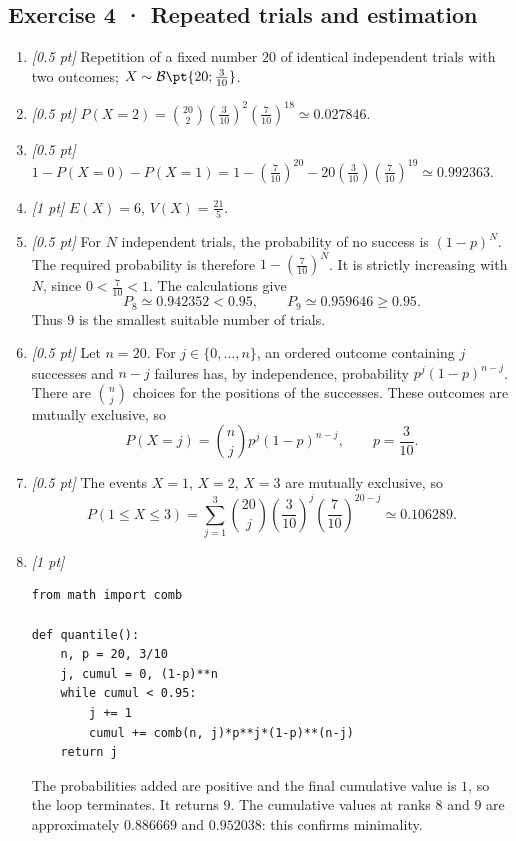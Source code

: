 \subsection*{Exercise 4 · Repeated trials and estimation}\begin{enumerate}

\item \textit{[0.5 pt]} Repetition of a fixed number $20$ of identical independent trials with two outcomes; $X\sim\mathcal B\pt{20;\frac{3}{10}}$.

\item \textit{[0.5 pt]} $P(X=2)=\binom{20}2(\frac{3}{10})^2(\frac{7}{10})^{18}\simeq\num{0,027846}$.

\item \textit{[0.5 pt]} $1-P(X=0)-P(X=1)=1-(\frac{7}{10})^{20}-20(\frac{3}{10})(\frac{7}{10})^{19}\simeq\num{0,992363}$.

\item \textit{[1 pt]} $E(X)=6$, $V(X)=\frac{21}{5}$.

\item \textit{[0.5 pt]} For $N$ independent trials, the probability of no success is $(1-p)^N$. The required probability is therefore $1-(\frac{7}{10})^N$. It is strictly increasing with $N$, since $0<\frac{7}{10}<1$. The calculations give
\[P_{8}\simeq\num{0,942352}<\num{0,95},\qquad P_{9}\simeq\num{0,959646}\ge\num{0,95}.\]
Thus $9$ is the smallest suitable number of trials.

\item \textit{[0.5 pt]} Let $n=20$. For $j\in\{0,\ldots,n\}$, an ordered outcome containing $j$ successes and $n-j$ failures has, by independence, probability $p^j(1-p)^{n-j}$. There are $\binom nj$ choices for the positions of the successes. These outcomes are mutually exclusive, so
\[P(X=j)=\binom nj p^j(1-p)^{n-j},\qquad p=\frac{3}{10}.\]

\item \textit{[0.5 pt]} The events $X=1$, $X=2$, $X=3$ are mutually exclusive, so
\[P(1\le X\le3)=\sum_{j=1}^3\binom{20}j(\frac{3}{10})^j(\frac{7}{10})^{20-j}\simeq\num{0,106289}.\]


\item \textit{[1 pt]} 
\begin{lstlisting}
from math import comb

def quantile():
    n, p = 20, 3/10
    j, cumul = 0, (1-p)**n
    while cumul < 0.95:
        j += 1
        cumul += comb(n, j)*p**j*(1-p)**(n-j)
    return j
\end{lstlisting}
The probabilities added are positive and the final cumulative value is $1$, so the loop terminates. It returns $9$. The cumulative values at ranks $8$ and $9$ are approximately $\num{0,886669}$ and $\num{0,952038}$: this confirms minimality.

\end{enumerate}

